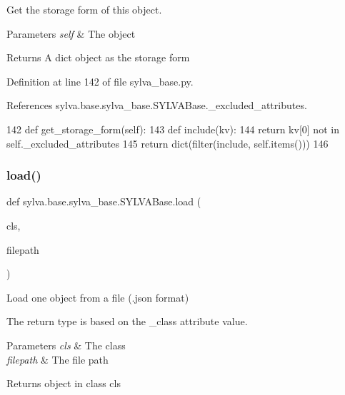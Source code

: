 Get the storage form of this object. 


\begin{DoxyParams}{Parameters}
{\em self} & The object\\
\hline
\end{DoxyParams}
\begin{DoxyReturn}{Returns}
A dict object as the storage form 
\end{DoxyReturn}


Definition at line 142 of file sylva\+\_\+base.\+py.



References sylva.\+base.\+sylva\+\_\+base.\+S\+Y\+L\+V\+A\+Base.\+\_\+excluded\+\_\+attributes.


\begin{DoxyCode}
142     \textcolor{keyword}{def }get\_storage\_form(self):
143         \textcolor{keyword}{def }include(kv):
144             \textcolor{keywordflow}{return} kv[0] \textcolor{keywordflow}{not} \textcolor{keywordflow}{in} self.\_excluded\_attributes
145         \textcolor{keywordflow}{return} dict(filter(include, self.items()))
146 
\end{DoxyCode}
\mbox{\label{classsylva_1_1base_1_1sylva__base_1_1_s_y_l_v_a_base_af68e05257afb40aa828aa9e2a73b267f}} 
\subsubsection{\texorpdfstring{load()}{load()}}
{\footnotesize\ttfamily def sylva.\+base.\+sylva\+\_\+base.\+S\+Y\+L\+V\+A\+Base.\+load (\begin{DoxyParamCaption}\item[{}]{cls,  }\item[{}]{filepath }\end{DoxyParamCaption})}



Load one object from a file (.json format) 

The return type is based on the \+\_\+class attribute value.


\begin{DoxyParams}{Parameters}
{\em cls} & The class \\
\hline
{\em filepath} & The file path\\
\hline
\end{DoxyParams}
\begin{DoxyReturn}{Returns}
object in class cls 
\end{DoxyReturn}


